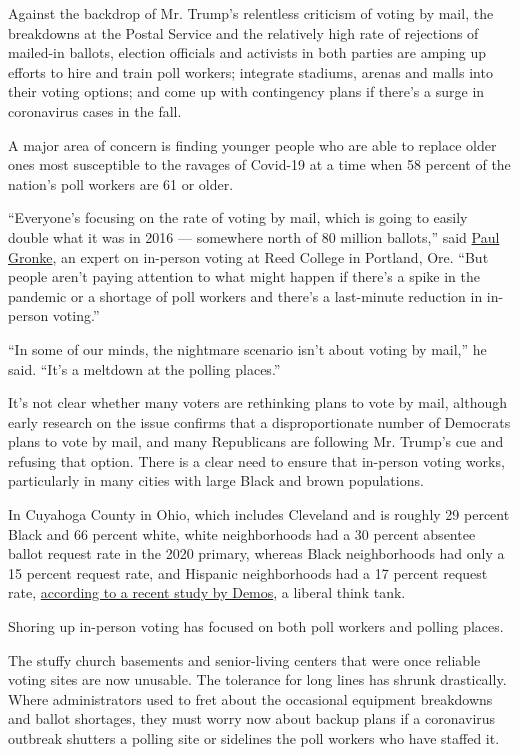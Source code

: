 Against the backdrop of Mr. Trump's relentless criticism of voting by
mail, the breakdowns at the Postal Service and the relatively high rate
of rejections of mailed-in ballots, election officials and activists in
both parties are amping up efforts to hire and train poll workers;
integrate stadiums, arenas and malls into their voting options; and come
up with contingency plans if there's a surge in coronavirus cases in the
fall.

A major area of concern is finding younger people who are able to
replace older ones most susceptible to the ravages of Covid-19 at a time
when 58 percent of the nation's poll workers are 61 or older.

``Everyone's focusing on the rate of voting by mail, which is going to
easily double what it was in 2016 --- somewhere north of 80 million
ballots,'' said \href{https://blogs.reed.edu/paul-gronke/}{Paul Gronke},
an expert on in-person voting at Reed College in Portland, Ore. ``But
people aren't paying attention to what might happen if there's a spike
in the pandemic or a shortage of poll workers and there's a last-minute
reduction in in-person voting.''

``In some of our minds, the nightmare scenario isn't about voting by
mail,'' he said. ``It's a meltdown at the polling places.''

It's not clear whether many voters are rethinking plans to vote by mail,
although early research on the issue confirms that a disproportionate
number of Democrats plans to vote by mail, and many Republicans are
following Mr. Trump's cue and refusing that option. There is a clear
need to ensure that in-person voting works, particularly in many cities
with large Black and brown populations.

In Cuyahoga County in Ohio, which includes Cleveland and is roughly 29
percent Black and 66 percent white, white neighborhoods had a 30 percent
absentee ballot request rate in the 2020 primary, whereas Black
neighborhoods had only a 15 percent request rate, and Hispanic
neighborhoods had a 17 percent request rate,
\href{https://www.demos.org/research/how-ohio-continued-silence-black-and-brown-voters-vote-mail-election}{according
to a recent study by Demos}, a liberal think tank.

Shoring up in-person voting has focused on both poll workers and polling
places.

The stuffy church basements and senior-living centers that were once
reliable voting sites are now unusable. The tolerance for long lines has
shrunk drastically. Where administrators used to fret about the
occasional equipment breakdowns and ballot shortages, they must worry
now about backup plans if a coronavirus outbreak shutters a polling site
or sidelines the poll workers who have staffed it.

